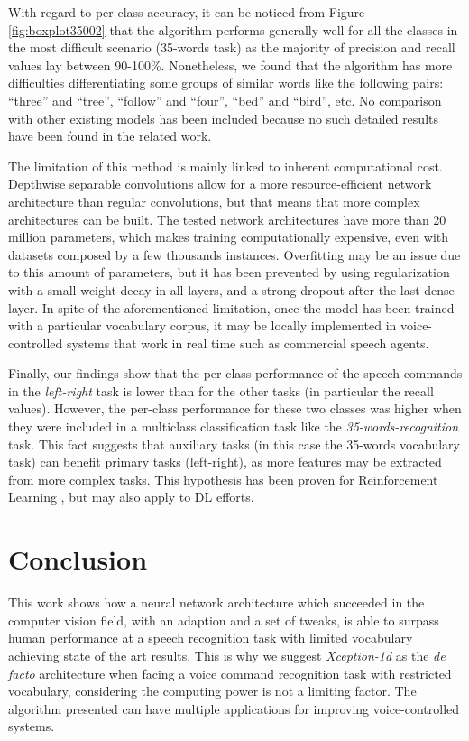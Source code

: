 With regard to per-class accuracy, it can be noticed from Figure \ref{fig:boxplot35002} that the algorithm performs generally well for all the classes in the most difficult scenario (35-words task) as the majority of precision and recall values lay between 90-100\%. Nonetheless, we found that the algorithm has more difficulties differentiating some groups of similar words like the following pairs: ``three'' and ``tree'', ``follow'' and ``four'', ``bed'' and ``bird'', etc. No comparison with other existing models has been included because no such detailed results have been found in the related work.

The limitation of this method is mainly linked to inherent computational cost. Depthwise separable convolutions allow for a more resource-efficient network architecture than regular convolutions, but that means that more complex architectures can be built. The tested network architectures have more than 20 million parameters, which makes training computationally expensive, even with datasets composed by a few thousands instances. Overfitting may be an issue due to this amount of parameters, but it has been prevented by using regularization with a small weight decay in all layers, and a strong dropout after the last dense layer. In spite of the aforementioned limitation, once the model has been trained with a particular vocabulary corpus, it may be locally implemented in voice-controlled systems that work in real time such as commercial speech agents.

Finally, our findings show that the per-class performance of the speech commands in the \textit{left-right} task is lower than for the other tasks (in particular the recall values). However, the per-class performance for these two classes was higher when they were included in a multiclass classification task like the \textit{35-words-recognition} task. This fact suggests that auxiliary tasks (in this case the 35-words vocabulary task) can benefit primary tasks (left-right), as more features may be extracted from more complex tasks. This hypothesis has been proven for Reinforcement Learning \cite{Jaderberg2016}, but may also apply to DL efforts.


\section{Conclusion} \label{sec:conclusion}
This work shows how a neural network architecture which succeeded in the computer vision field, with an adaption and a set of tweaks, is able to surpass human performance at a speech recognition task with limited vocabulary achieving state of the art results. This is why we suggest \textit{Xception-1d} as the \textit{de facto} architecture when facing a voice command recognition task with restricted vocabulary,  considering the computing power is not a limiting factor. The algorithm presented can have multiple  applications for improving voice-controlled systems.

